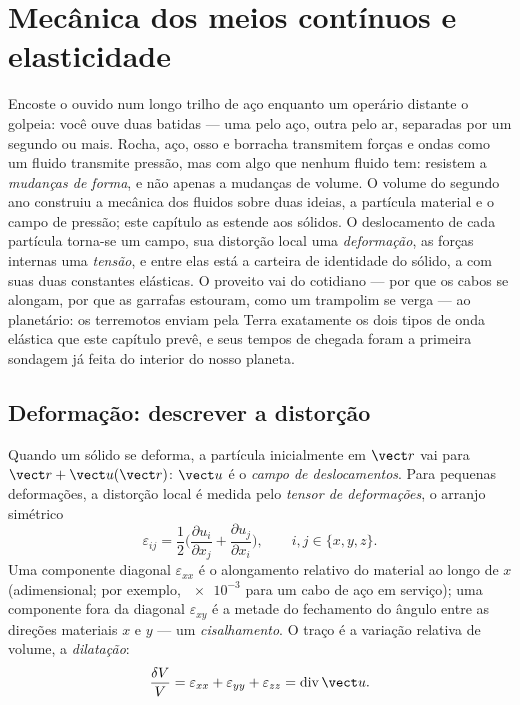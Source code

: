 \chapter{Mecânica dos meios contínuos e elasticidade}\label{ch:b3:continuum-elasticity}

Encoste o ouvido num longo trilho de aço enquanto um operário distante
o golpeia: você ouve duas batidas --- uma pelo aço, outra pelo ar,
separadas por um segundo ou mais. Rocha, aço, osso e borracha
transmitem forças e ondas como um fluido transmite pressão, mas com
algo que nenhum fluido tem: resistem a \emph{mudanças de forma}, e não
apenas a mudanças de volume. O volume do segundo ano construiu a
mecânica dos fluidos sobre duas ideias, a partícula material e o campo
de pressão; este capítulo as estende aos sólidos. O deslocamento de
cada partícula torna-se um campo, sua distorção local uma
\emph{deformação}, as forças internas uma \emph{tensão}, e entre elas
está a carteira de identidade do sólido, a  com suas duas
constantes elásticas. O proveito vai do cotidiano --- por que os cabos
se alongam, por que as garrafas estouram, como um trampolim se verga
--- ao planetário: os terremotos enviam pela Terra exatamente os dois
tipos de onda elástica que este capítulo prevê, e seus tempos de
chegada foram a primeira sondagem já feita do interior do nosso
planeta.

\section{Deformação: descrever a distorção}

\begin{definition}\label{def:b3:continuum-elasticity:strain}
Quando um sólido se deforma, a partícula inicialmente em $\vect r$ vai
para $\vect r + \vect u(\vect r)$: $\vect u$ é o
\emph{campo de deslocamentos}. Para pequenas deformações, a distorção
local é medida pelo \emph{tensor de deformações}, o arranjo simétrico
\[
\varepsilon_{ij} = \frac12\Big(
 \frac{\partial u_i}{\partial x_j} + \frac{\partial u_j}{\partial x_i}
\Big) , \qquad i, j \in \{x, y, z\} .
\]
Uma componente diagonal $\varepsilon_{xx}$ é o alongamento relativo do
material ao longo de $x$ (adimensional; por exemplo, $\num{e-3}$ para
um cabo de aço em serviço); uma componente fora da diagonal
$\varepsilon_{xy}$ é a metade do fechamento do ângulo entre as
direções materiais $x$ e $y$ --- um \emph{cisalhamento}. O traço é a
variação relativa de volume, a \emph{dilatação}:
\[
\frac{\delta V}{V} = \varepsilon_{xx} + \varepsilon_{yy} +
\varepsilon_{zz} = \operatorname{div}\vect u .
\]
\end{definition}

